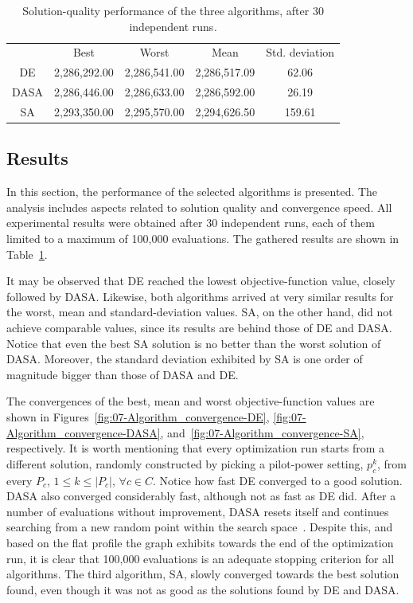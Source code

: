 \begin{table}
\centering

\caption{Solution-quality performance of the three algorithms, after 30 independent
runs\textit{\emph{.}}\textit{\label{tab:07-Algorithm_performance}}}


\begin{tabular}{ccccc}
\cmidrule{2-5} 
 & Best & Worst & Mean & Std. deviation\tabularnewline\addlinespace
\midrule
DE & 2,286,292.00 & 2,286,541.00 & 2,286,517.09 & 62.06\tabularnewline
DASA & 2,286,446.00 & 2,286,633.00 & 2,286,592.00 & 26.19\tabularnewline
SA  & 2,293,350.00 & 2,295,570.00 & 2,294,626.50 & 159.61\tabularnewline
\bottomrule
\end{tabular}
\end{table}



\subsection{Results \label{sub:07-Results}}

\noindent In this section, the performance of the selected algorithms
is presented. The analysis includes aspects related to solution quality
and convergence speed. All experimental results were obtained after
30 independent runs, each of them limited to a maximum of 100,000
evaluations. The gathered results are shown in Table~\ref{tab:07-Algorithm_performance}.

It may be observed that DE reached the lowest objective-function value,
closely followed by DASA. Likewise, both algorithms arrived at very
similar results for the worst, mean and standard-deviation values.
SA, on the other hand, did not achieve comparable values, since its
results are behind those of DE and DASA. Notice that even the best
SA solution is no better than the worst solution of DASA. Moreover,
the standard deviation exhibited by SA is one order of magnitude bigger
than those of DASA and DE.

The convergences of the best, mean and worst objective-function values
are shown in Figures~\ref{fig:07-Algorithm_convergence-DE}, \ref{fig:07-Algorithm_convergence-DASA},
and~\ref{fig:07-Algorithm_convergence-SA}, respectively. It is worth
mentioning that every optimization run starts from a different solution,
randomly constructed by picking a pilot-power setting, $p_{c}^{k}$,
from every $P_{c}$, $1\le k\le|P_{c}|$, $\forall c\in C$. Notice
how fast DE converged to a good solution. DASA also converged considerably
fast, although not as fast as DE did. After a number of evaluations
without improvement, DASA resets itself and continues searching from
a new random point within the search space~\cite{korosec2010_DASA}.
Despite this, and based on the flat profile the graph exhibits towards
the end of the optimization run, it is clear that 100,000 evaluations
is an adequate stopping criterion for all algorithms. The third algorithm,
SA, slowly converged towards the best solution found, even though
it was not as good as the solutions found by DE and DASA.

